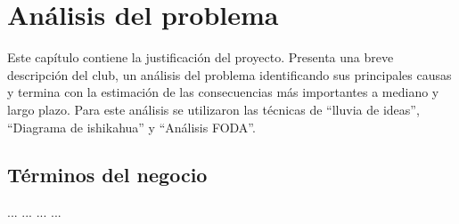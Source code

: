 \chapter{Análisis del problema}
\label{cap:analisis}

	Este capítulo contiene la justificación del proyecto. Presenta una breve descripción del club, un análisis del problema identificando sus principales causas y termina con la estimación de las consecuencias más importantes a mediano y largo plazo. Para este análisis se utilizaron las técnicas de ``lluvia de ideas'', ``Diagrama de ishikahua'' y ``Análisis FODA''.

\section{Términos del negocio}
\label{sec:terminosDeNegocio}
\begin{brGlosario}[
	version=1.0, 
	author=Gabriela Moreno, 
	revisor=Ulises Pérez, 
	status =\cdtStEdition
]
	 ...
	 ...
	 ...
	 ...

%	
%	
%	
%	
%
%	
%	
\end{brGlosario}



